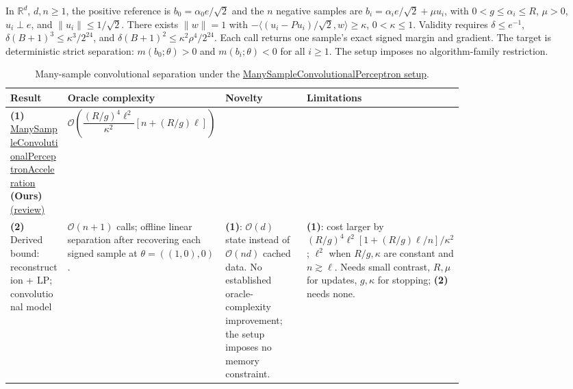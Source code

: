 \begin{table}[tp]
\centering
\caption{Many-sample convolutional separation under the \href{https://github.com/k3nfalt/longtails/blob/main/LongTails/Setups/ManySampleConvolutionalPerceptron.lean}{ManySampleConvolutionalPerceptron setup}.}\label{tab:ManySampleConvolutionalPerceptron}
\parbox{\linewidth}{\footnotesize In $\mathbb R^d$, $d,n\ge1$, the positive reference is $b_0=\alpha_0 e/\sqrt2$ and the $n$ negative samples are $b_i=\alpha_i e/\sqrt2+\mu u_i$, with $0<g\le\alpha_i\le R$, $\mu>0$, $u_i\perp e$, and $\|u_i\|\le1/\sqrt2$. There exists $\|w\|=1$ with $-\langle(u_i-Pu_i)/\sqrt2,w\rangle\ge\kappa$, $0<\kappa\le1$. Validity requires $\delta\le e^{-1}$, $\delta(B+1)^3\le\kappa^3/2^{24}$, and $\delta(B+1)^2\le\kappa^2\rho^4/2^{24}$. Each call returns one sample's exact signed margin and gradient. The target is deterministic strict separation: $m(b_0;\theta)>0$ and $m(b_i;\theta)<0$ for all $i\ge1$. The setup imposes no algorithm-family restriction.}\par\smallskip
\begin{threeparttable}
\footnotesize
\setlength{\tabcolsep}{4pt}\renewcommand{\arraystretch}{1.25}
\begin{tabularx}{\linewidth}{@{}>{\raggedright\arraybackslash}p{0.20\linewidth}>{\raggedright\arraybackslash}p{0.32\linewidth}>{\raggedright\arraybackslash}p{0.25\linewidth}>{\raggedright\arraybackslash}X@{}}
\toprule
\textbf{Result} & \textbf{Oracle complexity} & \textbf{Novelty} & \textbf{Limitations} \\
\midrule
\textbf{(1)} \href{https://github.com/k3nfalt/longtails/blob/main/LongTails/Theorems/ManySampleConvolutionalPerceptronAcceleration.lean}{Many\allowbreak Sample\allowbreak Convolutional\allowbreak Perceptron\allowbreak Acceleration} \textbf{(Ours)} \href{https://github.com/k3nfalt/longtails/blob/main/scripts/reviews/ManySampleConvolutionalPerceptronAcceleration.md}{(review)}
& $\mathcal{O}\!\left(\dfrac{(R/g)^4\ell^2}{\kappa^2}\left[n+(R/g)\ell\right]\right)$ & & \\
\midrule[1.2pt]
\textbf{(2)} Derived bound: reconstruction + LP; convolutional model \citep[Sec.~2]{mscpTyurin2026v2}
& $\mathcal{O}(n+1)$ calls; offline linear separation after recovering each signed sample at $\theta=((1,0),0)$.
& \textbf{(1)}: $\mathcal{O}(d)$ state instead of $\mathcal{O}(nd)$ cached data. No established oracle-complexity improvement; the setup imposes no memory constraint.
& \textbf{(1)}: cost larger by $(R/g)^4\ell^2[1+(R/g)\ell/n]/\kappa^2$; $\ell^2$ when $R/g,\kappa$ are constant and $n\gtrsim\ell$. Needs small contrast, $R,\mu$ for updates, $g,\kappa$ for stopping; \textbf{(2)} needs none. \\

\end{tabularx}
\end{threeparttable}
\end{table}

